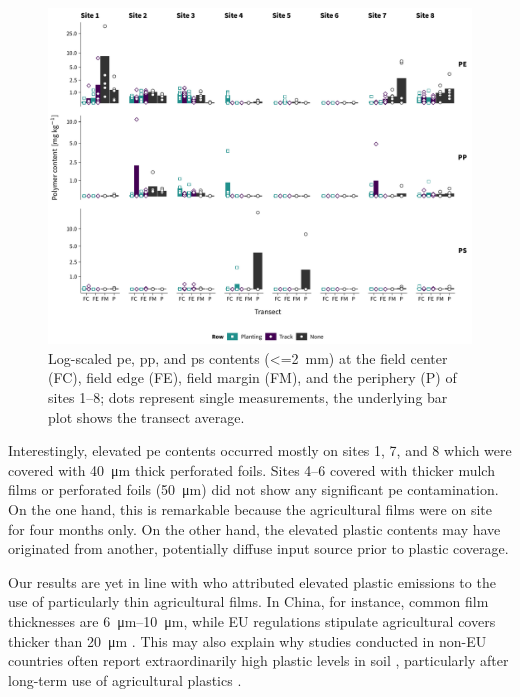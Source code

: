 \begin{figure}
	\centering
	\includegraphics[width=\textwidth]{figures/py-screening}
	\caption[\Ac{pe}, \ac{pp}, and \ac{ps} contents (\SI{<=2}{\milli\meter}).]{Log-scaled \ac{pe}, \ac{pp}, and \ac{ps} contents (\SI{<=2}{\milli\meter}) at the field center (FC), field edge (FE), field margin (FM), and the periphery (P) of sites 1--8; dots represent single measurements, the underlying bar plot shows the transect average.}
	\label{fig:py-screening}
\end{figure}

Interestingly, elevated \ac{pe} contents occurred mostly on sites 1, 7, and 8 which were covered with \SI{40}{\micro\meter} thick perforated foils. Sites 4--6 covered with thicker mulch films or perforated foils (\SI{50}{\micro\meter}) did not show any significant \ac{pe} contamination.
On the one hand, this is remarkable because the agricultural films were on site for four months only. On the other hand, the elevated plastic contents may have originated from another, potentially diffuse input source prior to plastic coverage.

Our results are yet in line with \citet{ZhangStatus2016} who attributed elevated plastic emissions to the use of particularly thin agricultural films. In China, for instance, common film thicknesses are \SIrange{6}{10}{\micro\meter}, while EU regulations stipulate agricultural covers thicker than \SI{20}{\micro\meter} \citep{EN13655Plastics2018}. This may also explain why studies conducted in non-EU countries often report extraordinarily high plastic levels in soil \citep{LiuWhite2014}, particularly after long-term use of agricultural plastics \citep{HuangAgricultural2020,ZhangDistribution2018}.

